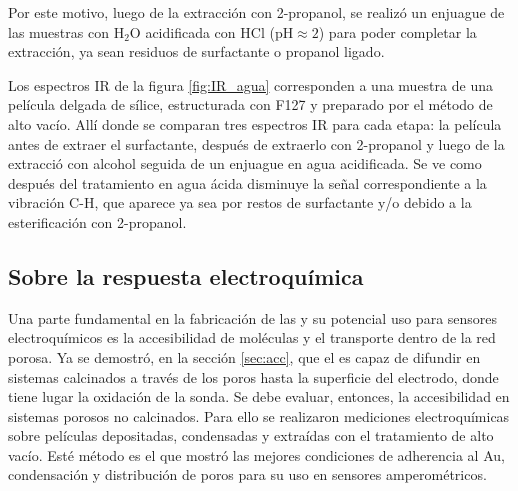 		Por este motivo, luego de la extracción con 2-propanol, se realizó un enjuague de las muestras con H$_2$O acidificada con HCl (pH$\approx 2$) para poder completar la extracción, ya sean residuos de surfactante o propanol ligado.
				
		Los espectros IR de la figura \ref{fig:IR_agua} corresponden a una muestra de una película delgada de sílice, estructurada con F127 y preparado por el método de alto vacío. Allí donde se comparan tres espectros IR para cada etapa: la película antes de extraer el surfactante, después de extraerlo con 2-propanol y luego de la extracció con alcohol seguida de un enjuague en agua acidificada. Se ve como después del tratamiento en agua ácida disminuye la señal correspondiente a la vibración C-H, que aparece ya sea por restos de surfactante y/o debido a la esterificación con 2-propanol.

	\vspace*{6mm}\subsection{Sobre la respuesta electroquímica}\label{sec:acc_eq}

	  Una parte fundamental en la fabricación de las \pdm\space y su potencial uso para sensores electroquímicos es la accesibilidad de moléculas y el transporte dentro de la red porosa. Ya se demostró, en la sección \ref{sec:acc}, que el \aminorutenio\space es capaz de difundir en sistemas calcinados a través de los poros hasta la superficie del electrodo, donde tiene lugar la oxidación de la sonda. Se debe evaluar, entonces, la accesibilidad en sistemas porosos no calcinados. Para ello se realizaron mediciones electroquímicas sobre películas depositadas, condensadas y extraídas con el tratamiento de alto vacío. Esté método es el que mostró las mejores condiciones de adherencia al Au, condensación y distribución de poros para su uso en sensores amperométricos. 

